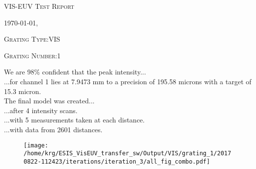 \documentclass[12pt,a4paper]{article}
\begin{document}
\begin{center}
{\scshape\LARGE VIS-EUV Test Report \par}
{\scshape\Large \today, \currenttime \par}
\bigskip
{\scshape\large Grating Type:VIS \par}
{\scshape\large Grating Number:1 \par}
\end{center}
\noindent We are 98\% confident that the peak intensity...\\
\indent...for channel 1 lies at 7.9473 mm to a precision of 195.58 microns with a target of 15.3 micron.\\
\noindent The final model was created...\\
\indent...after 4 intensity scans.\\
\indent...with 5 measurements taken at each distance.\\
\indent...with data from 2601 distances.\\
\begin{figure}[H]
\centering
\texttt{[image: /home/krg/ESIS\_VisEUV\_transfer\_sw/Output/VIS/grating\_1/20170822-112423/iterations/iteration\_3/all\_fig\_combo.pdf]}\\
\end{figure}
\end{document}
